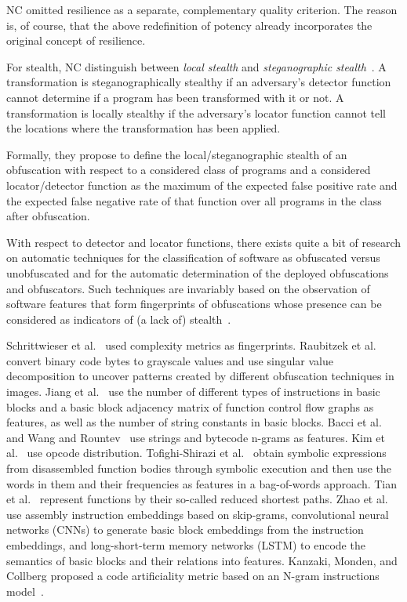 NC omitted resilience as a separate, complementary quality criterion. The reason is, of course, that the above redefinition of potency already incorporates the original concept of resilience.

For stealth, NC distinguish between \emph{local stealth} and \emph{steganographic stealth}~\cite{collbergbook}. A transformation is steganographically stealthy if an adversary's detector function cannot determine if a program has been transformed with it or not. A transformation is locally stealthy if the adversary's locator function cannot tell the locations where the transformation has been applied.

Formally, they propose to define the local/steganographic stealth of an obfuscation with respect to a considered class of programs and a considered locator/detector function as the maximum of the expected false positive rate and the expected false negative rate of that function over all programs in the class after obfuscation. 

With respect to detector and locator functions, there exists quite a bit of research on automatic techniques for the classification of software as obfuscated versus unobfuscated and for the automatic determination of the deployed obfuscations and obfuscators. Such techniques are invariably based on the observation of software features that form fingerprints of obfuscations whose presence can be considered as indicators of (a lack of) stealth~\cite{obfuscation_detection}.

Schrittwieser et al.~\cite{modeling_stealth} used complexity metrics as fingerprints. Raubitzek et al.~\cite{obfuscation_detection4} convert binary code bytes to grayscale values and use singular value decomposition to uncover patterns created by different obfuscation techniques in images. Jiang et al.~\cite{obfuscation_detection2} use the number of different types of instructions in basic blocks and a basic block adjacency matrix of function control flow graphs as features, as well as the number of string constants in basic blocks. Bacci et al.~\cite{obfuscation_detection3} and Wang and Rountev~\cite{obfuscation_detection5} use strings and bytecode n-grams as features. Kim et al.~\cite{obfuscation_detection6} use opcode distribution. Tofighi-Shirazi et al.~\cite{obfuscation_detection7} obtain symbolic expressions from disassembled function bodies through symbolic execution and then use the words in them and their frequencies as features in a bag-of-words approach. Tian et al.~\cite{obfuscation_recognition} represent functions by their so-called reduced shortest paths. Zhao et al.~\cite{obfuscation_detection8} use assembly instruction embeddings based on skip-grams, convolutional neural networks (CNNs) to generate basic block embeddings from the instruction embeddings, and long-short-term memory networks (LSTM) to encode the semantics of basic blocks and their relations into features. Kanzaki, Monden, and Collberg proposed a code artificiality metric based on an N-gram instructions model~\cite{code_artificiality}.

